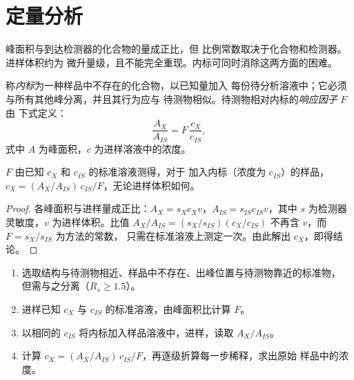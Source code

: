 \section{定量分析}

峰面积与到达检测器的化合物的量成正比，但
比例常数取决于化合物和检测器。进样体积约为
微升量级，且不能完全重现。内标可同时消除这两方面的困难。

\begin{definition}[响应因子与内标]\label{def:b2:chromatography:quantitative}
称\emph{内标}为一种样品中不存在的化合物，以已知量加入
每份待分析溶液中；它必须与所有其他峰分离，并且其行为应与
待测物相似。待测物相对内标的\emph{响应因子} $F$ 由
下式定义：
\begin{equation*}
\frac{A_X}{A_{IS}} = F\,\frac{c_X}{c_{IS}},
\end{equation*}
式中 $A$ 为峰面积，$c$ 为进样溶液中的浓度。
\end{definition}

\begin{proposition}[内标定量]\label{prop:b2:chromatography:internal-standard}
$F$ 由已知 $c_X$ 和 $c_{IS}$ 的标准溶液测得，对于
加入内标（浓度为 $c_{IS}$）的样品，$c_X = (A_X/A_{IS})\,c_{IS}/F$，无论进样体积如何。
\end{proposition}

\begin{proof}
各峰面积与进样量成正比：$A_X = s_X c_X v$，$A_{IS} = s_{IS} c_{IS} v$，其中
$s$ 为检测器灵敏度，$v$ 为进样体积。比值 $A_X/A_{IS} = (s_X/s_{IS})(c_X/c_{IS})$
不再含 $v$，而 $F = s_X/s_{IS}$ 为方法的常数，
只需在标准溶液上测定一次。由此解出 $c_X$，即得结论。
\end{proof}

\begin{method}[用内标法定量]\label{met:b2:chromatography:internal-standard}
\begin{enumerate}
  \item 选取结构与待测物相近、样品中不存在、出峰位置与待测物靠近的标准物，
        但需与之分离（$R_s \ge 1.5$）。
  \item 进样已知 $c_X$ 与 $c_{IS}$ 的标准溶液，由峰面积比计算 $F$。
  \item 以相同的 $c_{IS}$ 将内标加入样品溶液中，进样，读取 $A_X/A_{IS}$。
  \item 计算 $c_X = (A_X/A_{IS})\,c_{IS}/F$，再逐级折算每一步稀释，求出原始
        样品中的浓度。
\end{enumerate}
\end{method}


